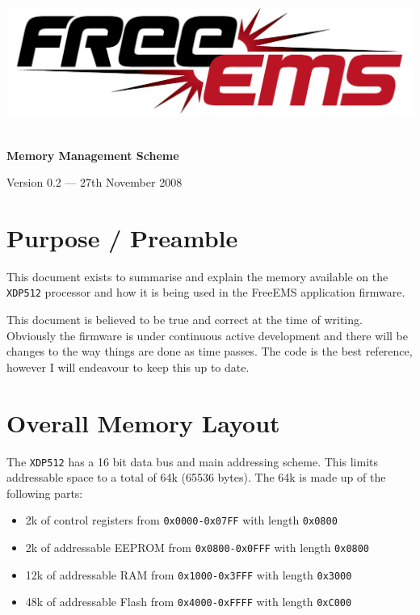 \documentclass[12pt,a4paper,titlepage]{article}
\begin{document}
\begin{titlepage} 
\begin{center}

\includegraphics[width=1\textwidth]{./logos/freeems}\\[1cm] \vfill

\HRule \\[0.8cm]
{ \huge \bfseries Memory Management Scheme}\\[0.4cm]
\HRule \vfill

\Large 

{\large Version 0.2 --- 27th November 2008}



\section {Purpose / Preamble} 

This document exists to summarise and explain the memory available on the
\texttt{XDP512} processor and how it is being used in the FreeEMS application
firmware.

This document is believed to be true and correct at the time of writing.
Obviously the firmware is under continuous active development and there will
be changes to the way things are done as time passes. The code is the best
reference, however I will endeavour to keep this up to date.




\section{Overall Memory Layout}

The \texttt{XDP512} has a 16 bit data bus and main addressing scheme. This
limits addressable space to a total of 64k (65536 bytes). The 64k is made up of
the following parts:

\begin{itemize}
\item 2k of control registers from \texttt{0x0000-0x07FF} with length \texttt{0x0800}
\item 2k of addressable EEPROM from \texttt{0x0800-0x0FFF} with length \texttt{0x0800}
\item 12k of addressable RAM from \texttt{0x1000-0x3FFF} with length \texttt{0x3000}
\item 48k of addressable Flash from \texttt{0x4000-0xFFFF} with length \texttt{0xC000}
\end{itemize}


\end{center}
\end{titlepage}
\end{document}
